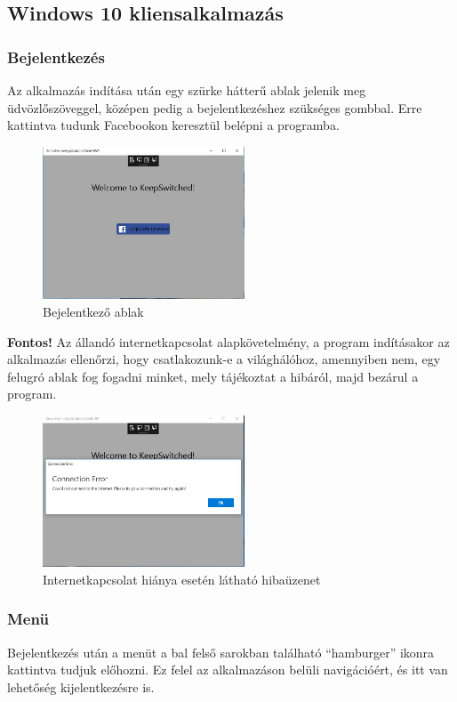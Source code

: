 \documentclass[a4paper,12pt]{report}
\begin{document}
\subsection{Windows 10 kliensalkalmazás}

\subsubsection{Bejelentkezés}
    Az alkalmazás indítása után egy szürke hátterű ablak jelenik meg üdvözlőszöveggel, középen pedig a bejelentkezéshez szükséges
    gombbal. Erre kattintva tudunk Facebookon keresztül belépni a programba.

\begin{figure}[H]
    \centering
    \includegraphics[width=6cm]{images/loginview.jpg}
    \caption{Bejelentkező ablak}
    \label{fig: Login}
\end{figure}

    \textbf{Fontos!} Az állandó internetkapcsolat alapkövetelmény, a program indításakor az alkalmazás ellenőrzi, hogy csatlakozunk-e
    a világhálóhoz, amennyiben nem, egy felugró ablak fog fogadni minket, mely tájékoztat a hibáról, majd bezárul a program.

\begin{figure}[H]
    \centering
    \includegraphics[width=6cm]{images/connectionerror.jpg}
    \caption{Internetkapcsolat hiánya esetén látható hibaüzenet}
    \label{fig: ConnectionError}
\end{figure}

\subsubsection{Menü}
    Bejelentkezés után a menüt a bal felső sarokban található ``hamburger'' ikonra kattintva tudjuk előhozni. Ez felel az
    alkalmazáson belüli navigációért, és itt van lehetőség kijelentkezésre is.
\end{document}

